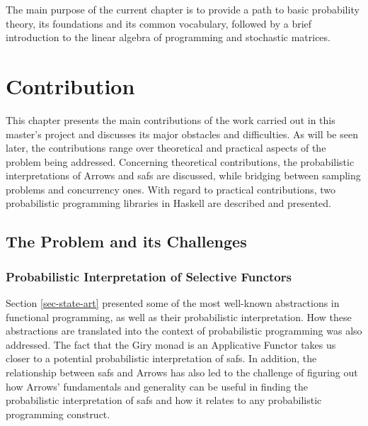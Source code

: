 \documentclass[
  oneside,
  11pt, a4paper,
  footinclude=true,
  headinclude=true,
  cleardoublepage=empty
]{scrbook}
\theoremstyle{definition}
\theoremstyle{definition}
\begin{document}
    The main purpose of the current chapter is to provide a path to basic probability theory, its foundations and its common vocabulary, followed by a brief introduction to the linear algebra of programming and stochastic matrices.
    
    \chapter{Contribution}\label{sec-current-work}
    
    This chapter presents the main contributions of the work carried out in this master's project and discusses its major obstacles and difficulties.
    As will be seen later, the contributions range over theoretical and practical aspects of the problem being addressed. Concerning theoretical contributions, the probabilistic interpretations of Arrows and \glspl{saf} are discussed, while bridging between sampling problems and concurrency ones. With regard to practical contributions, two probabilistic programming libraries in Haskell are described and presented.
    
	\section{The Problem and its Challenges}\label{ch-problem}
	
	
	\subsection{Probabilistic Interpretation of Selective Functors}
	
	Section \ref{sec-state-art} presented some of the most well-known abstractions in functional programming, as well as their probabilistic interpretation. How these abstractions are translated into the context of probabilistic programming was also addressed. The fact that the Giry monad \citep{giry1982, jtobin} is an Applicative Functor takes us closer to a potential probabilistic interpretation of \glspl{saf}. In addition, the relationship between \glspl{saf} and Arrows \citep{andrey2019selective} has also led to the challenge of figuring out how Arrows' fundamentals and generality can be useful in finding %
    the probabilistic interpretation of \glspl{saf} and how it relates to any probabilistic programming construct.
\end{document}
